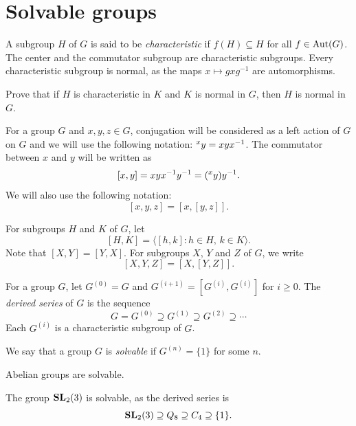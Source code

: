 
\section{Solvable groups}

A subgroup $H$ of $G$ is said to be \emph{characteristic} if 
$f(H)\subseteq H$ for all $f\in\operatorname{Aut}(G)$. 
The center and the commutator subgroup are
characteristic subgroups. 
Every characteristic subgroup is normal, 
as the maps $x\mapsto gxg^{-1}$ are automorphisms. 

\begin{exercise}
    Prove that if $H$ is characteristic in $K$ and $K$ is normal in $G$, then
    $H$ is normal in $G$. 
\end{exercise}

For a group $G$ and $x,y,z\in G$, conjugation will be considered as a left action of $G$ on $G$ 
and we will use the following notation: $\prescript{x}{}y=xyx^{-1}$. The commutator between $x$ and $y$ 
will be written as 
\[
[x,y]=xyx^{-1}y^{-1}=(\prescript{x}{}y)y^{-1}.
\]
We will also use the following notation:  
\[
[x,y,z]=[x,[y,z]].
\]

For subgroups $H$ and $K$ of $G$, let 
\[
[H,K]=\langle [h,k]:h\in H,\,k\in K\rangle.
\]
Note that $[X,Y]=[Y,X]$. 
For subgroups $X$, $Y$ and $Z$ of $G$, we write 
\[
[X,Y,Z]=\left[ X,[Y,Z] \right].
\]

For a group $G$, let 
$G^{(0)}=G$ and 
$G^{(i+1)}=[G^{(i)},G^{(i)}]$ for $i\geq0$.
The \emph{derived series} of $G$ is the sequence
\[
G=G^{(0)}\supseteq G^{(1)}\supseteq G^{(2)}\supseteq\cdots
\]
Each $G^{(i)}$ is a characteristic subgroup of $G$.

\begin{definition}
We say that a group 
$G$ is \emph{solvable} if $G^{(n)}=\{1\}$ for some $n$.  
\end{definition}

\begin{example}
	Abelian groups are solvable. 
\end{example}

\begin{example}
	The group $\mathbf{SL}_2(3)$ is solvable, as the derived series is 
	\[
	\mathbf{SL}_2(3)\supseteq Q_8\supseteq C_4\supseteq \{1\}.
	\]
\end{example}

